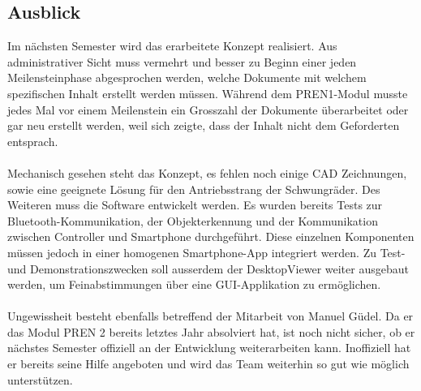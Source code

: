 \subsection{Ausblick}
Im nächsten Semester wird das erarbeitete Konzept realisiert. Aus administrativer Sicht muss vermehrt und besser zu Beginn einer jeden Meilensteinphase abgesprochen werden, welche Dokumente mit welchem spezifischen Inhalt erstellt werden müssen. Während dem PREN1-Modul musste jedes Mal vor einem Meilenstein ein Grosszahl der Dokumente überarbeitet oder gar neu erstellt werden, weil sich zeigte, dass der Inhalt nicht dem Geforderten entsprach.\\
\\
Mechanisch gesehen steht das Konzept, es fehlen noch einige CAD Zeichnungen, sowie eine geeignete Lösung für den Antriebsstrang der Schwungräder. Des Weiteren muss die Software entwickelt werden. Es wurden bereits Tests zur Bluetooth-Kommunikation, der Objekterkennung und der Kommunikation zwischen Controller und Smartphone durchgeführt. Diese einzelnen Komponenten müssen jedoch in einer homogenen Smartphone-App integriert werden. Zu Test- und Demonstrationszwecken soll ausserdem der DesktopViewer weiter ausgebaut werden, um Feinabstimmungen über eine GUI-Applikation zu ermöglichen.\\
\\
Ungewissheit besteht ebenfalls betreffend der Mitarbeit von Manuel Güdel. Da er das Modul PREN 2 bereits letztes Jahr absolviert hat, ist noch nicht sicher, ob er nächstes Semester offiziell an der Entwicklung weiterarbeiten kann. Inoffiziell hat er bereits seine Hilfe angeboten und wird das Team weiterhin so gut wie möglich unterstützen.
